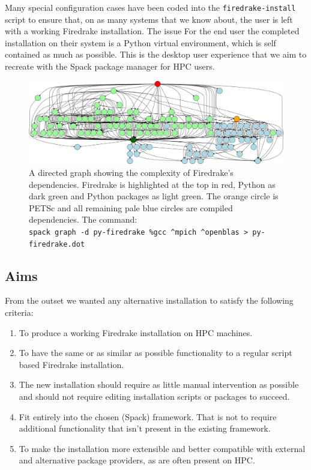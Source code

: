 \documentclass[a4paper,11pt]{article}
\begin{document}
Many special configuration cases have been coded into the \verb`firedrake-install` script to ensure that, on as many systems that we know about, the user is left with a working Firedrake installation.
The issue 
For the end user the completed installation on their system is a Python virtual environment, which is self contained as much as possible.
This is the desktop user experience that we aim to recreate with the Spack package manager for HPC users.

\begin{figure}[htp]
	\centering
	\includegraphics[width=\textwidth]{firedrake_deps.png}
	\caption{A directed graph showing the complexity of Firedrake's dependencies. Firedrake is highlighted at the top in red, Python as dark green and Python packages as light green. The orange circle is PETSc and all remaining pale blue circles are compiled dependencies. The command:\\ \texttt{spack graph -d py-firedrake \%gcc \^{}mpich \^{}openblas \textgreater{} py-firedrake.dot}}
	\label{fig:fddeps}
\end{figure}

\subsection{Aims}
\label{ssec:spack_aims}
From the outset we wanted any alternative installation to satisfy the following criteria:
\begin{enumerate}[topsep=2pt, partopsep=0pt, itemsep=1pt, parsep=1pt]
	\item To produce a working Firedrake installation on HPC machines.
	\item To have the same or as similar as possible functionality to a regular script based Firedrake installation.
	\item The new installation should require as little manual intervention as possible and should not require editing installation scripts or packages to succeed.
	\item Fit entirely into the chosen (Spack) framework. That is not to require additional functionality that isn't present in the existing framework.
	\item To make the installation more extensible and better compatible with external and alternative package providers, as are often present on HPC.
\end{enumerate}
\end{document}
